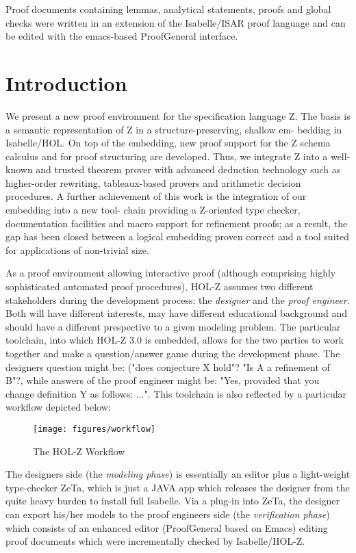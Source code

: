 \documentclass[10pt,a4paper,bigheadings,pdftex,bibtotoc,chapterprefix,appendixprefix,twoside,DIVcalc]{scrbook}
\begin{document}
Proof documents containing lemmas, analytical statements, proofs and
global checks were written in an extension of the Isabelle/ISAR proof
language and can be edited with the emacs-based ProofGeneral
interface.


\chapter{Introduction}
We present a new proof environment for the specification language Z.
The basis is a semantic representation of Z in a structure-preserving,
shallow em- bedding in Isabelle/HOL. On top of the embedding, new
proof support for the Z schema calculus and for proof structuring are
developed. Thus, we integrate Z into a well-known and trusted theorem
prover with advanced deduction technology such as higher-order
rewriting, tableaux-based provers and arithmetic decision
procedures. A further achievement of this work is the integration of
our embedding into a new tool- chain providing a Z-oriented type
checker, documentation facilities and macro support for refinement
proofs; as a result, the gap has been closed between a logical
embedding proven correct and a tool suited for applications of
non-trivial size.

As a proof environment allowing interactive proof (although comprising
highly sophisticated automated proof procedures), HOL-Z assumes two
different stakeholders during the development process: the
\emph{designer} and the \emph{proof engineer}. Both will have
different interests, may have different educational background and
should have a different prespective to a given modeling problem.  The
particular toolchain, into which HOL-Z 3.0 is embedded, allows for the
two parties to work together and make a question/answer game during
the development phase. The designers question might be: ("does
conjecture X hold"? "Is A a refinement of B"?, while answers of the
proof engineer might be: "Yes, provided that you change definition Y
as follows: ...".  This toolchain is also reflected by a particular
workflow depicted below:

\begin{figure}
  \begin{center}
    \texttt{[image: figures/workflow]}
  \end{center}
  \caption{The HOL-Z Workflow\label{fig:work-flow}}
\end{figure}

The designers side (the \emph{modeling phase}) is 
essentially an editor plus a light-weight type-checker ZeTa, which
is just a JAVA app which releases the designer from the quite
heavy burden to install full Isabelle. Via a plug-in into ZeTa, 
the designer can export his/her models to the proof engineers side
(the \emph{verification phase}) which consists of an enhanced
editor (ProofGeneral based on Emacs) editing proof documents
which were incrementally checked by Isabelle/HOL-Z.
\end{document}
